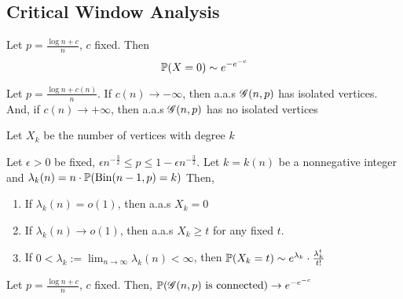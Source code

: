 \subsection{Critical Window Analysis}

\begin{theorem}
    Let $p = \frac{\log n + c}{n}$, $c$ fixed. Then
    \begin{equation}
        \operatorname{\mathbb{P}}(X = 0) \sim e^{-e^{-c}}
    \end{equation}
\end{theorem}

\begin{corollary}
    Let $p = \frac{\log n + c(n)}{n}$. 
    If $c(n) \rightarrow -\infty$, then a.a.s $\operatorname{\mathscr{G}}(n, p)$ has isolated vertices.
    And, if $c(n) \rightarrow +\infty$, then a.a.s $\operatorname{\mathscr{G}}(n, p)$ has no isolated vertices
\end{corollary}

Let $X_k$ be the number of vertices with degree $k$
\begin{theorem}
    Let $\epsilon > 0$ be fixed, $\epsilon n^{-\frac{3}{2}} \leq p \leq 1 - \epsilon n^{-\frac{3}{2}}$.
    Let $k = k(n)$ be a nonnegative integer and $\lambda_k(n) = n\cdot\operatorname{\mathbb{P}}(\operatorname{\mathrm{Bin}}(n - 1, p) = k)$
    Then,
    \begin{enumerate}[label=(\roman*)]
        \item If $\lambda_k(n) = o(1)$, then a.a.s $X_k = 0$
        \item If $\lambda_k(n) \rightarrow o(1)$, then a.a.s $X_k \geq t$ for any fixed $t$.
        \item If $0 < \lambda_k := \lim_{n \rightarrow \infty} \lambda_k(n) < \infty$, then $\operatorname{\mathbb{P}}(X_k = t) \sim e^{\lambda_k}\cdot\frac{\lambda_k^t}{t!}$
    \end{enumerate}
\end{theorem}

\begin{theorem}
    Let $p = \frac{\log n + c}{n}$, $c$ fixed.
    Then, $\operatorname{\mathbb{P}}(\operatorname{\mathscr{G}}(n, p) \text{ is connected}) \rightarrow e^{-e^{-c}}$
\end{theorem}